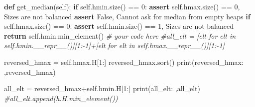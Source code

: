 \documentclass[
]{article}
\newenvironment{Shaded}{}{}
\newcommand{\BuiltInTok}[1]{\textcolor[rgb]{0.00,0.50,0.00}{#1}}
\newcommand{\CommentTok}[1]{\textcolor[rgb]{0.38,0.63,0.69}{\textit{#1}}}
\newcommand{\ControlFlowTok}[1]{\textcolor[rgb]{0.00,0.44,0.13}{\textbf{#1}}}
\newcommand{\DecValTok}[1]{\textcolor[rgb]{0.25,0.63,0.44}{#1}}
\newcommand{\KeywordTok}[1]{\textcolor[rgb]{0.00,0.44,0.13}{\textbf{#1}}}
\newcommand{\NormalTok}[1]{#1}
\newcommand{\OperatorTok}[1]{\textcolor[rgb]{0.40,0.40,0.40}{#1}}
\newcommand{\StringTok}[1]{\textcolor[rgb]{0.25,0.44,0.63}{#1}}
\newcommand{\VariableTok}[1]{\textcolor[rgb]{0.10,0.09,0.49}{#1}}
\begin{document}
\begin{Shaded}
\begin{Highlighting}[]
    \KeywordTok{def}\NormalTok{ get\_median(}\VariableTok{self}\NormalTok{):}
        \ControlFlowTok{if} \VariableTok{self}\NormalTok{.hmin.size() }\OperatorTok{==} \DecValTok{0}\NormalTok{:}
            \ControlFlowTok{assert} \VariableTok{self}\NormalTok{.hmax.size() }\OperatorTok{==} \DecValTok{0}\NormalTok{, }\StringTok{\textquotesingle{}Sizes are not balanced\textquotesingle{}}
            \ControlFlowTok{assert} \VariableTok{False}\NormalTok{, }\StringTok{\textquotesingle{}Cannot ask for median from empty heaps\textquotesingle{}}
        \ControlFlowTok{if} \VariableTok{self}\NormalTok{.hmax.size() }\OperatorTok{==} \DecValTok{0}\NormalTok{:}
            \ControlFlowTok{assert} \VariableTok{self}\NormalTok{.hmin.size() }\OperatorTok{==} \DecValTok{1}\NormalTok{, }\StringTok{\textquotesingle{}Sizes are not balanced\textquotesingle{}}
            \ControlFlowTok{return} \VariableTok{self}\NormalTok{.hmin.min\_element()}
        \CommentTok{\# your code here}
        \CommentTok{\#all\_elt = [elt for elt in self.hmin.\_\_repr\_\_()][1:{-}1]+[elt for elt in self.hmax.\_\_repr\_\_()][1:{-}1]}

\NormalTok{        reversed\_hmax }\OperatorTok{=} \VariableTok{self}\NormalTok{.hmax.H[}\DecValTok{1}\NormalTok{:]}
\NormalTok{        reversed\_hmax.sort()}
        \BuiltInTok{print}\NormalTok{(}\StringTok{\textquotesingle{}reversed\_hmax: \textquotesingle{}}\NormalTok{,reversed\_hmax)}

\NormalTok{        all\_elt }\OperatorTok{=}\NormalTok{ reversed\_hmax}\OperatorTok{+}\VariableTok{self}\NormalTok{.hmin.H[}\DecValTok{1}\NormalTok{:]}
        \BuiltInTok{print}\NormalTok{(}\StringTok{\textquotesingle{}all\_elt: \textquotesingle{}}\NormalTok{,all\_elt)}
        \CommentTok{\#all\_elt.append(h.H.min\_element())}




\end{Highlighting}
\end{Shaded}
\end{document}
